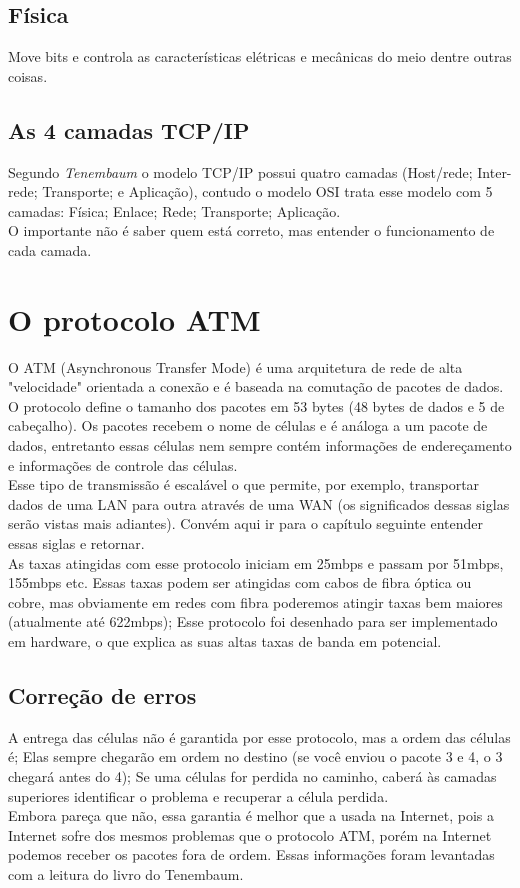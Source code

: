 \documentclass{article}
\begin{document}
\subsection{Física}
Move bits e controla as características elétricas e mecânicas do meio dentre
outras coisas.

\subsection{As 4 camadas TCP/IP}
Segundo \textit{Tenembaum} o modelo TCP/IP possui quatro camadas (Host/rede;
Inter-rede; Transporte; e Aplicação), contudo o modelo OSI trata esse modelo com
5 camadas: Física; Enlace; Rede; Transporte; Aplicação.\\
O importante não é saber quem está correto, mas entender o funcionamento de cada
camada.

\section{O protocolo ATM}
O ATM (Asynchronous Transfer Mode) é uma arquitetura de rede de alta
"velocidade" orientada a conexão e é baseada na comutação de pacotes de dados.\\
O protocolo define o tamanho dos pacotes em 53 bytes (48 bytes de dados e 5 de
cabeçalho). Os pacotes recebem o nome de células e é análoga a um pacote de
dados, entretanto essas células nem sempre contém informações de endereçamento
e informações de controle das células. \\
Esse tipo de transmissão é escalável o que permite, por exemplo, transportar
dados de uma LAN para outra através de uma WAN (os significados dessas siglas
serão vistas mais adiantes). Convém aqui ir para o capítulo seguinte entender
essas siglas e retornar. \\
As taxas atingidas com esse protocolo iniciam em 25mbps e passam por 51mbps,
155mbps etc. Essas taxas podem ser atingidas com cabos de fibra óptica ou cobre,
mas obviamente em redes com fibra poderemos atingir taxas bem maiores
(atualmente até 622mbps); Esse protocolo foi desenhado para ser implementado em
hardware, o que explica as suas altas taxas de banda em potencial.\\

\subsection{Correção de erros}
A entrega das células não é garantida por esse protocolo, mas a ordem das
células é; Elas sempre chegarão em ordem no destino (se você enviou o pacote 3 e
4, o 3 chegará antes do 4); Se uma células for perdida no caminho, caberá às
camadas superiores identificar o problema e recuperar a célula perdida.\\
Embora pareça que não, essa garantia é melhor que a usada na Internet, pois a
Internet sofre dos mesmos problemas que o protocolo ATM, porém na Internet
podemos receber os pacotes fora de ordem. Essas informações foram levantadas com
a leitura do livro do Tenembaum.
\end{document}
